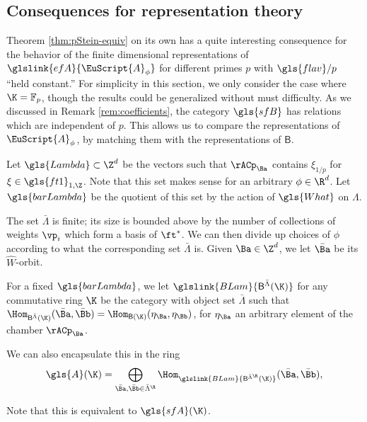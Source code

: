 \subsection{Consequences for representation theory}
\label{sec:cons-repr-theory}
Theorem \ref{thm:pStein-equiv} on its own has a quite interesting
consequence for  the behavior of the finite dimensional
representations of $\glslink{efA}{\EuScript{A}_\phi}$ for
different primes $p$ with  $\gls{flav}/p$  ``held constant.''  For simplicity in this section, we only consider the case where $\K=\mathbb{F}_p$, though the results could be
generalized without must difficulty.  As we discussed in Remark \ref{rem:coefficients}, the
category $\gls{sfB}$ has relations which are independent of $p$.
This allows us to compare the representations of $\EuScript{A}_\phi$,
by matching them with the representations of $\mathsf{B}.$ 


\begin{definition}\label{def:Lambda}
  Let $\gls{Lambda}\subset \Z^{d}$ be the vectors such that $\rACp_{\Ba}$
  contains $\xi_{1/p}$ for $\xi\in \gls{ft1}_{1,\Z}$.  Note that this set
  makes sense for an arbitrary $\phi \in \R^{d}$.  Let $\gls{barLambda}$ be the quotient of this set by
  the action of $\gls{What}$ on $\Lambda$.
\end{definition}
The set $\bar \Lambda$ is finite; its size is bounded above by the number
of collections of weights $\vp_i$ which form a basis of $\ft^*$.   We
can then divide up choices of $\phi$ according to what the
corresponding set $\bar \Lambda$ is.  Given  $\Ba\in \Z^d$, we let
$\bar{\Ba}$ be its $\widehat{W}$-orbit.
\begin{definition}\label{def:BLam}
  For a fixed $\gls{barLambda}$, we let $\glslink{BLam}{\mathsf{B}^{\bar \Lambda}(\K)}$
  for any commutative ring $\K$ be the category with object set
  $\bar \Lambda$ such that
  $\Hom_{\mathsf{B}^{\bar
      \Lambda}(\K)}(\bar{\Ba},\bar{\Bb})=\Hom_{\mathsf{B}(\K)}(\eta_\Ba,\eta_\Bb)$,
  for $\eta_\Ba$ an arbitrary element of the chamber $\rACp_{\Ba}$.

  We can also encapsulate this in the ring
  \begin{equation}
  \gls{A}(\K)=\bigoplus_{\bar{\Ba},\bar{\Bb}\in
    \bar\Lambda^{\R}}\Hom_{\glslink{BLam}{\mathsf{B}^{\bar{\Lambda}^{\R}}(\K)}}(\bar{\Ba},\bar{\Bb}),\label{eq:A-def}
\end{equation}

\end{definition}
Note that this is
equivalent to $\gls{sfA}(\K)$.  

